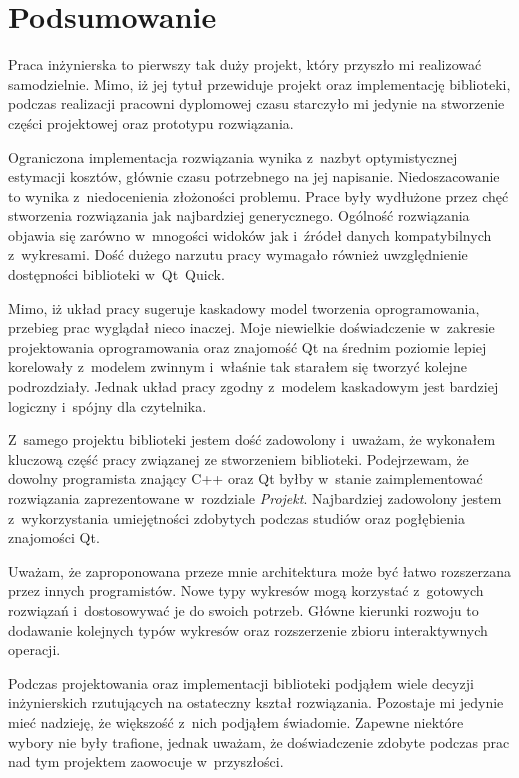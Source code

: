 \chapter{Podsumowanie}
Praca inżynierska to pierwszy tak duży projekt, który przyszło mi realizować samodzielnie. Mimo, iż jej tytuł przewiduje projekt oraz implementację biblioteki, podczas realizacji pracowni dyplomowej czasu starczyło mi jedynie na stworzenie części projektowej oraz prototypu rozwiązania.

Ograniczona implementacja rozwiązania wynika z~nazbyt optymistycznej estymacji kosztów, głównie czasu potrzebnego na jej napisanie. Niedoszacowanie to wynika z~niedocenienia złożoności problemu. Prace były wydłużone przez chęć stworzenia rozwiązania jak najbardziej generycznego. Ogólność rozwiązania objawia się zarówno w~mnogości widoków jak i~źródeł danych kompatybilnych z~wykresami. Dość dużego narzutu pracy wymagało również uwzględnienie dostępności biblioteki w~Qt~Quick.

Mimo, iż układ pracy sugeruje kaskadowy model tworzenia oprogramowania, przebieg prac wyglądał nieco inaczej. Moje niewielkie doświadczenie w~zakresie projektowania oprogramowania oraz znajomość Qt na średnim poziomie lepiej korelowały z~modelem zwinnym i~właśnie tak starałem się tworzyć kolejne podrozdziały. Jednak układ pracy zgodny z~modelem kaskadowym jest bardziej logiczny i~spójny dla czytelnika.

Z~samego projektu biblioteki jestem dość zadowolony i~uważam, że wykonałem kluczową część pracy związanej ze stworzeniem biblioteki. Podejrzewam, że dowolny programista znający C++ oraz Qt byłby w~stanie zaimplementować rozwiązania zaprezentowane w~rozdziale \textit{Projekt}. Najbardziej zadowolony jestem z~wykorzystania umiejętności zdobytych podczas studiów oraz pogłębienia znajomości Qt.

Uważam, że zaproponowana przeze mnie architektura może być łatwo rozszerzana przez innych programistów. Nowe typy wykresów mogą korzystać z~gotowych rozwiązań i~dostosowywać je do swoich potrzeb. Główne kierunki rozwoju to dodawanie kolejnych typów wykresów oraz rozszerzenie zbioru interaktywnych operacji.

Podczas projektowania oraz implementacji biblioteki podjąłem wiele decyzji inżynierskich rzutujących na ostateczny kształ rozwiązania. Pozostaje mi jedynie mieć nadzieję, że większość z~nich podjąłem świadomie. Zapewne niektóre wybory nie były trafione, jednak uważam, że doświadczenie zdobyte podczas prac nad tym projektem zaowocuje w~przyszłości.


